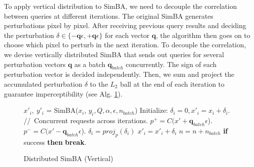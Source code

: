 To apply vertical distribution to SimBA, we need to decouple the correlation between queries at different iterations. The original SimBA generates perturbations pixel by pixel. After receiving previous query results and deciding the perturbation $\delta \in \{-\boldsymbol{q}\epsilon, +\boldsymbol{q}\epsilon\}$ for each vector $\boldsymbol{q}$, the algorithm then goes on to choose which pixel to perturb in the next iteration. To decouple the correlation, we devise vertically distributed SimBA that sends out queries for several perturbation vectors $\boldsymbol{q}$ as a batch $\boldsymbol{q}_{batch}$ concurrently. The sign of each perturbation vector is decided independently. Then, we sum and project the accumulated perturbation $\delta$ to the $L_2$ ball at the end of each iteration to guarantee imperceptibility (see Alg. \ref{alg:simba_vertical}). 

\clearpage

\begin{figure}[tbp]
\begin{minipage}{\textwidth}
\begin{algorithm}[H]
    \centering
    \caption{Distributed SimBA (Vertical)}
    \label{alg:simba_vertical}
    \begin{algorithmic}[1]
            \State $x'_{i},\ y'_{i}$ = SimBA($x_{i}$, $y_{i}, Q, \alpha, \epsilon, n_{batch}$)
            \Indent
                \State Initialize: $\delta_i = 0, x'_{i} = x_i + \delta_i$.
                \For {each iteration $n \in [0,\ n_{iter})$}
                    \State {}
                    \State //\ Concurrent requests across iterations.
                    \State $p^+ = C(x{'} + \boldsymbol{q}_{batch}\epsilon$).
                    \State $p^- = C(x{'} - \boldsymbol{q}_{batch}\epsilon$).
                            \State {} 
                            \State {} 
                        \EndIf
                    \EndFor
                    \State $\delta_i = proj_{p}(\delta_i)$
                    \State $x'_i = x'_i + \delta_i$
                    \State $n = n + n_{batch}$
                    \State \textbf{if} {success} \textbf{then} {\textbf{break}}.
                \EndFor
            \EndIndent
        \EndFor
    \end{algorithmic}
\end{algorithm}
\end{minipage}
\end{figure}

